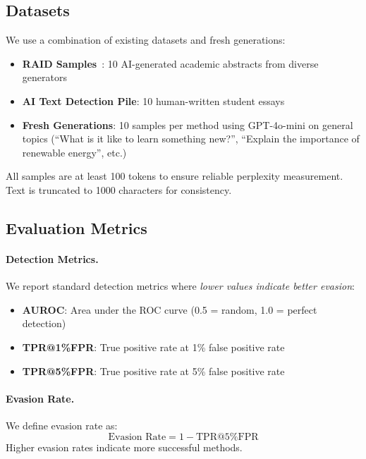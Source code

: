 \subsection{Datasets}

We use a combination of existing datasets and fresh generations:

\begin{itemize}
    \item \textbf{RAID Samples}~\citep{dugan2024raid}: 10 AI-generated academic abstracts from diverse generators
    \item \textbf{AI Text Detection Pile}: 10 human-written student essays
    \item \textbf{Fresh Generations}: 10 samples per method using GPT-4o-mini on general topics (``What is it like to learn something new?'', ``Explain the importance of renewable energy'', etc.)
\end{itemize}

All samples are at least 100 tokens to ensure reliable perplexity measurement. Text is truncated to 1000 characters for consistency.

\subsection{Evaluation Metrics}

\paragraph{Detection Metrics.} We report standard detection metrics where \textit{lower values indicate better evasion}:
\begin{itemize}
    \item \textbf{AUROC}: Area under the ROC curve (0.5 = random, 1.0 = perfect detection)
    \item \textbf{TPR@1\%FPR}: True positive rate at 1\% false positive rate
    \item \textbf{TPR@5\%FPR}: True positive rate at 5\% false positive rate
\end{itemize}

\paragraph{Evasion Rate.} We define evasion rate as:
\begin{equation}
    \text{Evasion Rate} = 1 - \text{TPR@5\%FPR}
\end{equation}
Higher evasion rates indicate more successful methods.

